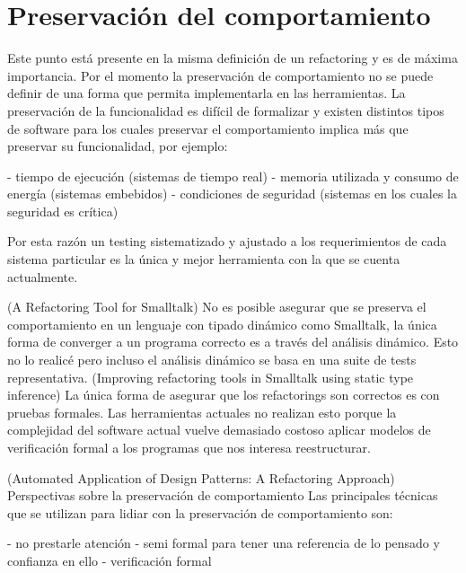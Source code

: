 \section{Preservación del comportamiento}
Este punto está presente en la misma
definición de un refactoring y es de máxima importancia. Por el momento la preservación de
comportamiento no se puede definir de una forma que permita implementarla en las
herramientas. La preservación de la funcionalidad es difícil de formalizar y existen
distintos tipos de software para los cuales preservar el comportamiento implica más que
preservar su funcionalidad, por ejemplo:

- tiempo de ejecución (sistemas de tiempo real) - memoria utilizada y consumo de energía (sistemas
embebidos) - condiciones de seguridad (sistemas en los cuales la seguridad es crítica)

Por esta razón un testing sistematizado y ajustado a los requerimientos de cada sistema particular
es la única y mejor herramienta con la que se cuenta actualmente.

(A Refactoring Tool for Smalltalk) No es posible asegurar que se preserva el comportamiento en un
lenguaje con tipado dinámico como Smalltalk, la única forma de converger a un programa correcto es a
través del análisis dinámico. Esto no lo realicé pero incluso el análisis dinámico se basa en una
suite de tests representativa. (Improving refactoring tools in Smalltalk using static type
inference) La única forma de asegurar que los refactorings son correctos es con pruebas formales.
Las herramientas actuales no realizan esto porque la complejidad del software actual vuelve
demasiado costoso aplicar modelos de verificación formal a los programas que nos interesa
reestructurar.

(Automated Application of Design Patterns: A Refactoring Approach) Perspectivas sobre la
preservación de comportamiento Las principales técnicas que se utilizan para lidiar con la
preservación de comportamiento son:

- no prestarle atención - semi formal para tener una referencia de lo pensado y confianza en ello -
verificación formal

